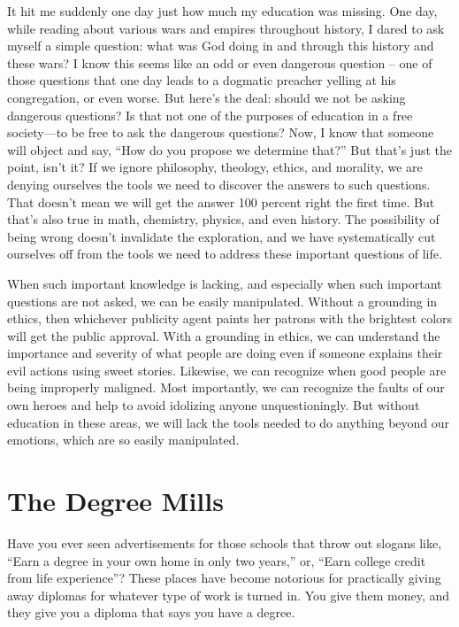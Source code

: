 It hit me suddenly one day just how much my education was missing. One
day, while reading about various wars and empires throughout history, I
dared to ask myself a simple question: what was God doing in and
through this history and these wars?  I know this seems like an odd or
even dangerous question – one of those questions that one day leads to
a dogmatic preacher yelling at
his congregation, or
even worse. But here’s the deal: should we not be asking dangerous
questions?  Is that not one of the purposes of education in a free
society—to be free to ask the dangerous questions?  Now, I know that
someone will object and say, “How do you propose we determine that?” 
But that’s just the point, isn’t it?  If we ignore philosophy,
theology, ethics, and morality, we are denying ourselves the tools we
need to discover the answers to such questions. That doesn’t mean we
will get the answer 100 percent right the first time. But that’s also
true in math, chemistry, physics, and even history. The possibility of
being wrong doesn’t invalidate the exploration, and we have
systematically cut ourselves off from the tools we need to address
these important questions of life. 

When such important knowledge is lacking, and especially when such
important questions are not asked, we can be easily manipulated.
Without a grounding in ethics, then whichever publicity agent paints
her patrons with the
brightest colors will get the public approval. With a grounding in
ethics, we can understand the importance and severity of what people
are doing even if someone explains their evil actions using sweet
stories. Likewise, we can recognize when good people are being
improperly maligned. Most importantly, we can recognize the faults of
our own heroes and help to avoid idolizing anyone unquestioningly. But
without education in these areas, we will lack the tools needed to do
anything beyond our emotions, which are so easily manipulated.

\section{The Degree Mills}

Have you ever seen advertisements for those
schools that throw out
slogans like, “Earn a degree in your own home in only two years,” or,
“Earn college credit from life experience”?  These places have become
notorious for practically giving away diplomas for whatever type of
work is turned in. You give them money, and they give you a diploma
that says you have a degree.

